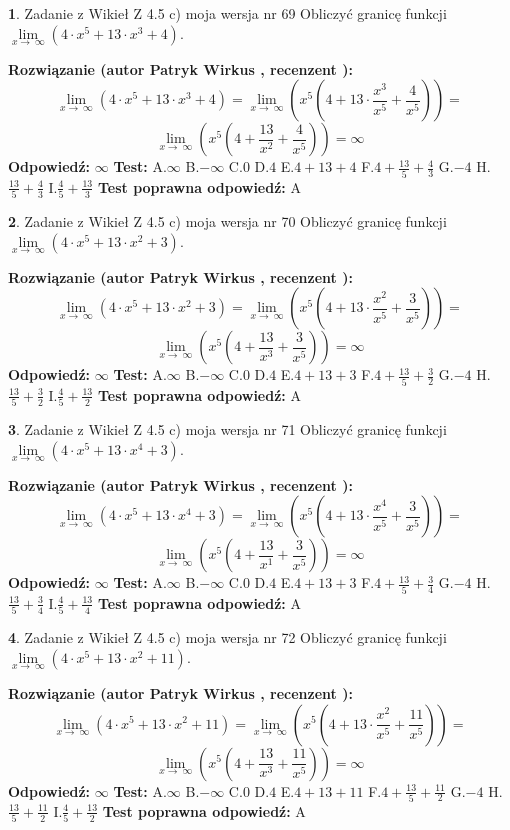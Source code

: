 \documentclass[12pt, a4paper]{article}
\theoremstyle{definition} %
\newtheorem{zad}{}
\newcommand{\zadStart}[1]{\begin{zad}#1\newline}
\newcommand{\zadStop}{\end{zad}}
\newcommand{\rozwStart}[2]{\noindent \textbf{Rozwiązanie (autor #1 , recenzent #2): }\newline}
\newcommand{\rozwStop}{\newline}
\newcommand{\odpStart}{\noindent \textbf{Odpowiedź:}\newline}
\newcommand{\odpStop}{\newline}
\newcommand{\testStart}{\noindent \textbf{Test:}\newline}
\newcommand{\testStop}{\newline}
\newcommand{\kluczStart}{\noindent \textbf{Test poprawna odpowiedź:}\newline}
\newcommand{\kluczStop}{\newline}
\begin{document}
\zadStart{Zadanie z Wikieł Z 4.5 c) moja wersja nr 69}
Obliczyć granicę funkcji  $\lim\limits_{x\to\ \infty}(4 \cdot x^{5}+13 \cdot x^{3}+4)$.
\zadStop
\rozwStart{Patryk Wirkus}{}
$$\lim\limits_{x\to\ \infty}(4 \cdot x^{5}+13 \cdot x^{3}+4) = \lim\limits_{x\to\ \infty}(x^{5}(4 +13 \cdot \frac{x^{3}}{x^{5}}+\frac{4}{x^{5}})) =$$ $$\lim\limits_{x\to\ \infty}(x^{5}(4 +\frac{13}{x^{2}}+\frac{4}{x^{5}})) =\infty$$
\rozwStop
\odpStart
$\infty$
\odpStop
\testStart
A.$\infty$ B.$-\infty$ C.$0$ D.$4$ E.$4 + 13 + 4$
F.$4+\frac{13}{5}+\frac{4}{3}$ G.$-4$
H.$\frac{13}{5}+\frac{4}{3}$
I.$\frac{4}{5}+\frac{13}{3}$
\testStop
\kluczStart
A
\kluczStop



\zadStart{Zadanie z Wikieł Z 4.5 c) moja wersja nr 70}
Obliczyć granicę funkcji  $\lim\limits_{x\to\ \infty}(4 \cdot x^{5}+13 \cdot x^{2}+3)$.
\zadStop
\rozwStart{Patryk Wirkus}{}
$$\lim\limits_{x\to\ \infty}(4 \cdot x^{5}+13 \cdot x^{2}+3) = \lim\limits_{x\to\ \infty}(x^{5}(4 +13 \cdot \frac{x^{2}}{x^{5}}+\frac{3}{x^{5}})) =$$ $$\lim\limits_{x\to\ \infty}(x^{5}(4 +\frac{13}{x^{3}}+\frac{3}{x^{5}})) =\infty$$
\rozwStop
\odpStart
$\infty$
\odpStop
\testStart
A.$\infty$ B.$-\infty$ C.$0$ D.$4$ E.$4 + 13 + 3$
F.$4+\frac{13}{5}+\frac{3}{2}$ G.$-4$
H.$\frac{13}{5}+\frac{3}{2}$
I.$\frac{4}{5}+\frac{13}{2}$
\testStop
\kluczStart
A
\kluczStop



\zadStart{Zadanie z Wikieł Z 4.5 c) moja wersja nr 71}
Obliczyć granicę funkcji  $\lim\limits_{x\to\ \infty}(4 \cdot x^{5}+13 \cdot x^{4}+3)$.
\zadStop
\rozwStart{Patryk Wirkus}{}
$$\lim\limits_{x\to\ \infty}(4 \cdot x^{5}+13 \cdot x^{4}+3) = \lim\limits_{x\to\ \infty}(x^{5}(4 +13 \cdot \frac{x^{4}}{x^{5}}+\frac{3}{x^{5}})) =$$ $$\lim\limits_{x\to\ \infty}(x^{5}(4 +\frac{13}{x^{1}}+\frac{3}{x^{5}})) =\infty$$
\rozwStop
\odpStart
$\infty$
\odpStop
\testStart
A.$\infty$ B.$-\infty$ C.$0$ D.$4$ E.$4 + 13 + 3$
F.$4+\frac{13}{5}+\frac{3}{4}$ G.$-4$
H.$\frac{13}{5}+\frac{3}{4}$
I.$\frac{4}{5}+\frac{13}{4}$
\testStop
\kluczStart
A
\kluczStop



\zadStart{Zadanie z Wikieł Z 4.5 c) moja wersja nr 72}
Obliczyć granicę funkcji  $\lim\limits_{x\to\ \infty}(4 \cdot x^{5}+13 \cdot x^{2}+11)$.
\zadStop
\rozwStart{Patryk Wirkus}{}
$$\lim\limits_{x\to\ \infty}(4 \cdot x^{5}+13 \cdot x^{2}+11) = \lim\limits_{x\to\ \infty}(x^{5}(4 +13 \cdot \frac{x^{2}}{x^{5}}+\frac{11}{x^{5}})) =$$ $$\lim\limits_{x\to\ \infty}(x^{5}(4 +\frac{13}{x^{3}}+\frac{11}{x^{5}})) =\infty$$
\rozwStop
\odpStart
$\infty$
\odpStop
\testStart
A.$\infty$ B.$-\infty$ C.$0$ D.$4$ E.$4 + 13 + 11$
F.$4+\frac{13}{5}+\frac{11}{2}$ G.$-4$
H.$\frac{13}{5}+\frac{11}{2}$
I.$\frac{4}{5}+\frac{13}{2}$
\testStop
\kluczStart
A
\kluczStop
\end{document}
